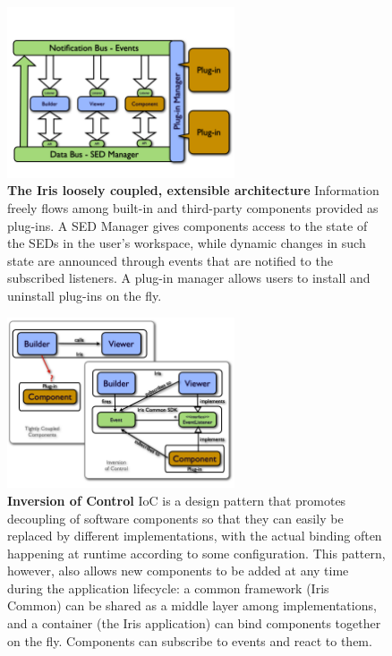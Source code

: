 \documentclass[final,5p]{elsarticle}
\begin{document}
\begin{figure}
\begin{center}
\includegraphics[width=0.6\textwidth]{figures/IrisDiagrams.001.png}
\caption{\textbf{The Iris loosely coupled, extensible architecture} Information freely flows among built-in and third-party components provided as plug-ins. A SED Manager gives components access to the state of the SEDs in the user's workspace, while dynamic changes in such state are announced through events that are notified to the subscribed listeners. A plug-in manager allows users to install and uninstall plug-ins on the fly.}
\label{fig:architecture}
\end{center}
\end{figure}

\begin{figure}
\begin{center}
\includegraphics[width=0.6\textwidth]{figures/IrisDiagrams.003.png}
\caption{\textbf{Inversion of Control} IoC is a design pattern that promotes decoupling of software components so that they can easily be replaced by different implementations, with the actual binding often happening at runtime according to some configuration. This pattern, however, also allows new components to be added at any time during the application lifecycle: a common framework (Iris Common) can be shared as a middle layer among implementations, and a container (the Iris application) can bind components together on the fly. Components can subscribe to events and react to them.}
\label{fig:ioc}
\end{center}
\end{figure}
\end{document}
